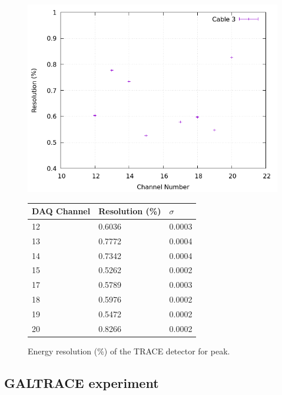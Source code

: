 \begin{figure}[h]
  \centering
  \begin{minipage}[b]{0.45\textwidth}
  \vspace{5mm}
    \includegraphics[width=\textwidth]{img/plot/cm/3_res_cm.png}
    \label{res:cm3}
  \end{minipage}
  \hfill
  \begin{minipage}[b]{0.45\textwidth}
  \begin{tabular}{lll}
    DAQ Channel & Resolution (\%) & $\sigma$ \\
    \midrule
    12 & \num{0.6036} & 0.0003 \\
    13 & \num{0.7772} & 0.0004 \\
    14 & \num{0.7342} & 0.0004 \\
    15 & \num{0.5262} & 0.0002 \\
    17 & \num{0.5789} & 0.0003 \\
    18 & \num{0.5976} & 0.0002 \\
    19 & \num{0.5472} & 0.0002 \\
    20 & \num{0.8266} & 0.0002 \\
    \bottomrule
  \end{tabular}
  \label{res:plot:cm3}
  \end{minipage}
  \caption{Energy resolution (\%) of the TRACE detector for  peak.}
  \label{res:cm}
\end{figure}

\clearpage

\subsection{GALTRACE experiment}


